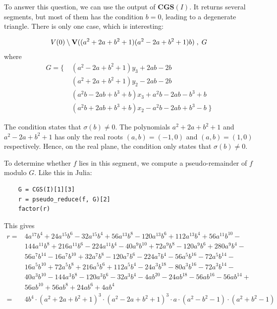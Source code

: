 \begin{example}
  To answer this question, we can use the output of $\mathbf{CGS}(I)$. It returns several segments, but most of them has the condition $b = 0$, leading to a degenerate triangle. There is only one case, which is interesting:

  \[V(0) \setminus \operatorname{\mathbf V}((a^{2} + 2a + b^{2} + 1)(a^{2} - 2a + b^{2} + 1)b)\;, \; G\] where
  \begin{align*}
 G = \{\; &(a^2 - 2a + b^2 + 1)y_3 + 2ab - 2b \\
          &(a^2 + 2a + b^2 + 1)y_2 - 2ab - 2b \\
          &(a^2b - 2ab + b^3 + b)x_3 + a^2b - 2ab - b^3 + b \\
          &(a^2b + 2ab + b^3 + b)x_2 - a^2b - 2ab + b^3 - b \; \}
  \end{align*}

  The condition states that $\sigma(b) \neq 0$. The polynomials $a^{2} + 2a + b^{2} + 1$ and $a^{2} - 2a + b^{2} + 1$ has only the real roots $(a, b) = (-1, 0)$ and $(a, b) = (1, 0)$ respectively. Hence, on the real plane, the condition only states that $\sigma(b) \neq 0$.

  To determine whether $f$ lies in this segment, we compute a pseudo-remainder of $f$ modulo $G$. Like this in Julia:

  \begin{verbatim}
    G = CGS(I)[1][3]
    r = pseudo_reduce(f, G)[2]
    factor(r)
  \end{verbatim}
  This gives
  \begin{align*}
    r = &4 a^{17} b^4 + 24 a^{15} b^6 - 32 a^{15} b^4 + 56 a^{13} b^8 - 120 a^{13} b^6 + 112 a^{13} b^4 + 56 a^{11} b^{10} - \\
        &144 a^{11} b^8 + 216 a^{11} b^6 - 224 a^{11} b^4 - 40 a^9 b^{10} + 72 a^9 b^8 - 120 a^9 b^6 + 280 a^9 b^4 - \\
        &56 a^7 b^{14} - 16 a^7 b^{10} + 32 a^7 b^8 - 120 a^7 b^6 - 224 a^7 b^4 - 56 a^5 b^{16} - 72 a^5 b^{14} - \\
        &16 a^5 b^{10} + 72 a^5 b^8 + 216 a^5 b^6 + 112 a^5 b^4 - 24 a^3 b^{18} - 80 a^3 b^{16} - 72 a^3 b^{14} - \\
        &40 a^3 b^{10} - 144 a^3 b^8 - 120 a^3 b^6 - 32 a^3 b^4 - 4 a b^{20} - 24 a b^{18} - 56 a b^{16} - 56 a b^{14} + \\
        &56 a b^{10} + 56 a b^8 + 24 a b^6 + 4 a b^4 \\
    = &4 b^{4}\cdot {(a^{2} + 2a + b^{2} + 1)}^{3} \cdot {(a^{2} - 2a + b^{2} + 1)}^{3} \cdot a \cdot (a^{2} - b^{2} - 1) \cdot (a^{2} + b^{2} - 1)
  \end{align*}


\end{example}
